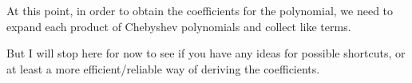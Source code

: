 At this point, in order to obtain the coefficients for the polynomial, we need to expand each product of Chebyshev polynomials and collect like terms.

But I will stop here for now to see if you have any ideas for possible shortcuts, or at least a more efficient/reliable way of deriving the coefficients.


